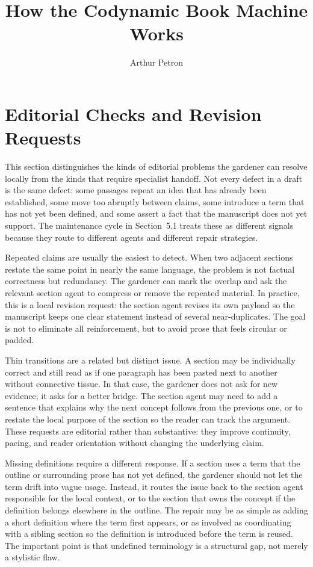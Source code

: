 \documentclass[11pt]{article}
\title{How the Codynamic Book Machine Works}
\author{Arthur Petron}
\begin{document}
\section*{Editorial Checks and Revision Requests}

This section distinguishes the kinds of editorial problems the gardener can resolve locally from the kinds that require specialist handoff. Not every defect in a draft is the same defect: some passages repeat an idea that has already been established, some move too abruptly between claims, some introduce a term that has not yet been defined, and some assert a fact that the manuscript does not yet support. The maintenance cycle in Section~5.1 treats these as different signals because they route to different agents and different repair strategies.

Repeated claims are usually the easiest to detect. When two adjacent sections restate the same point in nearly the same language, the problem is not factual correctness but redundancy. The gardener can mark the overlap and ask the relevant section agent to compress or remove the repeated material. In practice, this is a local revision request: the section agent revises its own payload so the manuscript keeps one clear statement instead of several near-duplicates. The goal is not to eliminate all reinforcement, but to avoid prose that feels circular or padded.

Thin transitions are a related but distinct issue. A section may be individually correct and still read as if one paragraph has been pasted next to another without connective tissue. In that case, the gardener does not ask for new evidence; it asks for a better bridge. The section agent may need to add a sentence that explains why the next concept follows from the previous one, or to restate the local purpose of the section so the reader can track the argument. These requests are editorial rather than substantive: they improve continuity, pacing, and reader orientation without changing the underlying claim.

Missing definitions require a different response. If a section uses a term that the outline or surrounding prose has not yet defined, the gardener should not let the term drift into vague usage. Instead, it routes the issue back to the section agent responsible for the local context, or to the section that owns the concept if the definition belongs elsewhere in the outline. The repair may be as simple as adding a short definition where the term first appears, or as involved as coordinating with a sibling section so the definition is introduced before the term is reused. The important point is that undefined terminology is a structural gap, not merely a stylistic flaw.
\end{document}
